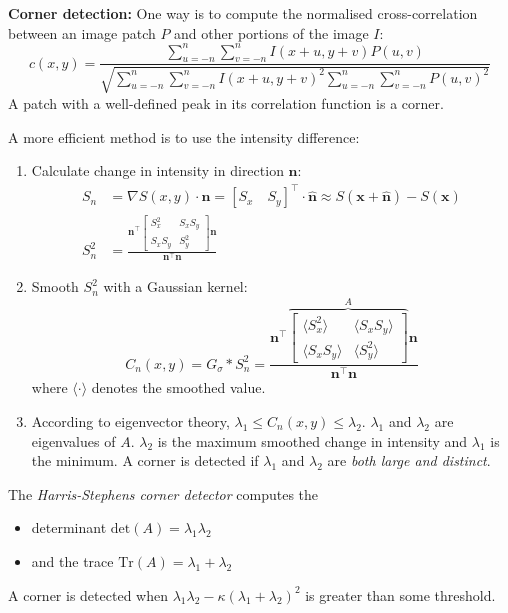 \documentclass[12pt]{article}
\begin{document}
\textbf{Corner detection:} One way is to compute the normalised cross-correlation between an image patch $P$ and other portions of the image $I$:
$$
c(x,y) = \frac{\sum_{u=-n}^{n} \sum_{v=-n}^{n} I(x+u, y+v) P(u,v)}{\sqrt{\sum_{u=-n}^{n} \sum_{v=-n}^{n} I(x+u, y+v)^2 \sum_{u=-n}^{n} \sum_{v=-n}^{n} P(u,v)^2}}
$$
A patch with a well-defined peak in its correlation function is a corner.

A more efficient method is to use the intensity difference:
\begin{enumerate}
    \item Calculate change in intensity in direction $\mathbf{n}$:
    \begin{align*}
        S_n &= \nabla S(x,y) \cdot \hat{\mathbf{n}} = [S_x \quad S_y]^\top \cdot \hat{\mathbf{n}} \approx S(\mathbf{x}+\hat{\mathbf{n}}) - S(\mathbf{x})\\
        S_n^2 &= \frac{\mathbf{n}^\top \begin{bmatrix}
            S_x^2 & S_x S_y \\
            S_x S_y & S_y^2
        \end{bmatrix} \mathbf{n}}{\mathbf{n}^\top \mathbf{n}}
    \end{align*}
    \item Smooth $S_n^2$ with a Gaussian kernel:
    $$
    C_n(x,y) = G_\sigma * S_n^2 = \frac{\mathbf{n}^\top \overbrace{\begin{bmatrix}
            \langle S_x^2 \rangle & \langle S_x S_y \rangle \\
            \langle S_x S_y \rangle & \langle S_y^2 \rangle
        \end{bmatrix}}^{A} \mathbf{n}}{\mathbf{n}^\top \mathbf{n}}
    $$
    where $\langle \cdot \rangle$ denotes the smoothed value.
    \item According to eigenvector theory, $\lambda_1 \leq C_n(x,y) \leq \lambda_2$. $\lambda_1$ and $\lambda_2$ are eigenvalues of $A$. $\lambda_2$ is the maximum smoothed change in intensity and $\lambda_1$ is the minimum.
    A corner is detected if $\lambda_1$ and $\lambda_2$ are \textit{both large and distinct}.
\end{enumerate}

The \textit{Harris-Stephens corner detector} computes the 
\begin{itemize}
    \item determinant $\text{det}(A) = \lambda_1 \lambda_2$ 
    \item and the trace $\text{Tr}(A) = \lambda_1 + \lambda_2$
\end{itemize}
A corner is detected when $\lambda_1 \lambda_2 - \kappa (\lambda_1 + \lambda_2)^2$ is greater than some threshold.
\end{document}
